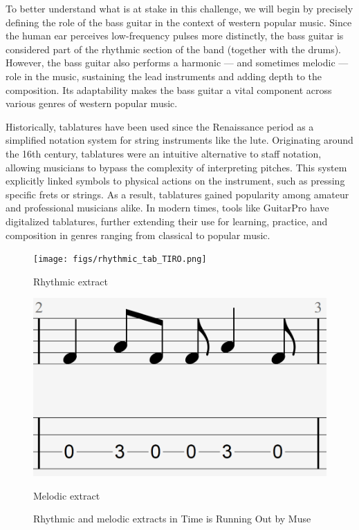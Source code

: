 \documentclass[11pt, a4paper]{article}
\begin{document}
To better understand what is at stake in this challenge, we will begin by precisely defining the role of the bass guitar in the context of western popular music.
Since the human ear perceives low-frequency pulses more distinctly, the bass guitar is considered part of the rhythmic section of the band (together with the drums)\cite{hoveSuperiorTimePerception2014}.
However, the bass guitar also performs a harmonic — and sometimes melodic — role in the music, sustaining the lead instruments and adding depth to the composition.
Its adaptability makes the bass guitar a vital component across various genres of western popular music.


Historically, tablatures have been used since the Renaissance period as a simplified notation system for string instruments like the lute.
Originating around the 16th century, tablatures were an intuitive alternative to staff notation, allowing musicians to bypass the complexity of interpreting pitches.
This system explicitly linked symbols to physical actions on the instrument, such as pressing specific frets or strings.
As a result, tablatures gained popularity among amateur and professional musicians alike.
In modern times, tools like GuitarPro have digitalized tablatures, further extending their use for learning, practice, and composition in genres ranging from classical to popular music\cite{sarmentoDadaGPDatasetTokenized2021}.

\begin{figure}[h!]
    \centering
    \begin{minipage}{0.45\textwidth}
        \centering
        \texttt{[image: figs/rhythmic\_tab\_TIRO.png]}
        \caption{Rhythmic extract}
    \end{minipage}%
    \hfill
    \begin{minipage}{0.45\textwidth}
        \centering
        \includegraphics[width=.5\linewidth]{figs/melodic_tab_TIRO.png}
        \caption{Melodic extract}
    \end{minipage}
    \label{fig:bass_tab_TIRO}
    \caption{Rhythmic and melodic extracts in Time is Running Out by Muse}
\end{figure}
\end{document}
